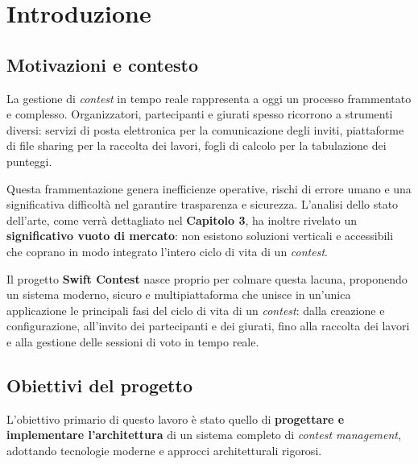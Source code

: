
\chapter{Introduzione}\label{ch:introduzione}

\section{Motivazioni e contesto}\label{sec:motivazioni-e-contesto}
La gestione di \emph{contest} in tempo reale rappresenta a oggi un processo frammentato e complesso.
Organizzatori, partecipanti e giurati spesso ricorrono a strumenti diversi: servizi di posta elettronica per la comunicazione degli inviti, piattaforme di file sharing per la raccolta dei lavori, fogli di calcolo per la tabulazione dei punteggi.

Questa frammentazione genera inefficienze operative, rischi di errore umano e una significativa difficoltà nel garantire trasparenza e sicurezza.
L'analisi dello stato dell'arte, come verrà dettagliato nel \textbf{Capitolo 3}, ha inoltre rivelato un \textbf{significativo vuoto di mercato}: non esistono soluzioni verticali e accessibili che coprano in modo integrato l'intero ciclo di vita di un \emph{contest}.

Il progetto \textbf{Swift Contest} nasce proprio per colmare questa lacuna, proponendo un sistema moderno, sicuro e multipiattaforma che unisce in un'unica applicazione le principali fasi del ciclo di vita di un \emph{contest}: dalla creazione e configurazione, all’invito dei partecipanti e dei giurati, fino alla raccolta dei lavori e alla gestione delle sessioni di voto in tempo reale.

\section{Obiettivi del progetto}\label{sec:obiettivi-del-progetto}
L’obiettivo primario di questo lavoro è stato quello di \textbf{progettare e implementare l'architettura} di un sistema completo di \emph{contest management}, adottando tecnologie moderne e approcci architetturali rigorosi.

